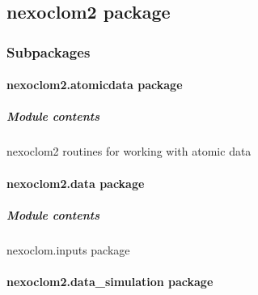 \documentclass[letterpaper,10pt,english]{sphinxmanual}
\begin{document}
\subsection{nexoclom2 package}
\label{\detokenize{apidocs/nexoclom2:nexoclom2-package}}\label{\detokenize{apidocs/nexoclom2::doc}}

\subsubsection{Subpackages}
\label{\detokenize{apidocs/nexoclom2:subpackages}}
\sphinxstepscope


\paragraph{nexoclom2.atomicdata package}
\label{\detokenize{apidocs/nexoclom2.atomicdata:nexoclom2-atomicdata-package}}\label{\detokenize{apidocs/nexoclom2.atomicdata::doc}}

\subparagraph{Module contents}
\label{\detokenize{apidocs/nexoclom2.atomicdata:module-nexoclom2.atomicdata}}\label{\detokenize{apidocs/nexoclom2.atomicdata:module-contents}}
\sphinxAtStartPar
nexoclom2 routines for working with atomic data

\sphinxstepscope


\paragraph{nexoclom2.data package}
\label{\detokenize{apidocs/nexoclom2.data:nexoclom2-data-package}}\label{\detokenize{apidocs/nexoclom2.data::doc}}

\subparagraph{Module contents}
\label{\detokenize{apidocs/nexoclom2.data:module-nexoclom2.data}}\label{\detokenize{apidocs/nexoclom2.data:module-contents}}
\sphinxAtStartPar
nexoclom.inputs package

\sphinxstepscope


\paragraph{nexoclom2.data\_simulation package}
\label{\detokenize{apidocs/nexoclom2.data_simulation:nexoclom2-data-simulation-package}}\label{\detokenize{apidocs/nexoclom2.data_simulation::doc}}
\end{document}
